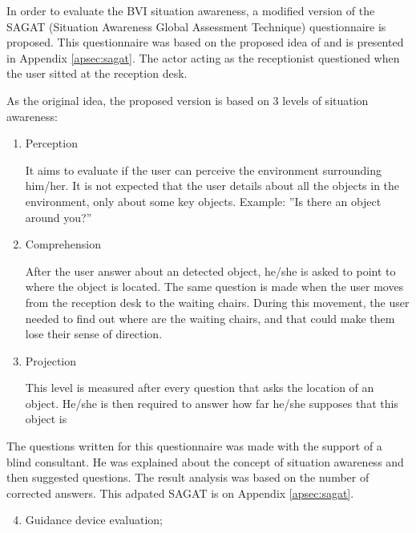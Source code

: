         In order to evaluate the BVI situation awareness, a modified version of the SAGAT (Situation Awareness Global Assessment Technique) questionnaire is proposed. This questionnaire was based on the proposed idea of  and is presented in Appendix \ref{apsec:sagat}. The actor acting as the receptionist questioned when the user sitted at the reception desk. 

        As the original idea, the proposed version is based on 3 levels of situation awareness:

        \begin{enumerate}[leftmargin = 6em, label = Level \arabic* -- ]
            \item Perception
            
            It aims to evaluate if the user can perceive the environment surrounding him/her. It is not expected that the user details about all the objects in the environment, only about some key objects. Example: ”Is there an object around you?”

            \item Comprehension
    
            After the user answer about an detected object, he/she is asked to point to where the object is located. The same question is made when the user moves from the reception desk to the waiting chairs. During this movement, the user needed to find out where are the waiting chairs, and that could make them lose their sense of direction.
    
            \item Projection
            
            This level is measured after every question that asks the location of an object. He/she is then required to answer how far he/she supposes that this object is
            
        \end{enumerate}      

        The questions written for this questionnaire was made with the support of a blind consultant. He was explained about the concept of situation awareness and then suggested questions. The result analysis was based on the number of corrected answers. This adpated SAGAT is on Appendix \ref{apsec:sagat}.

        \begin{enumerate} [label = \Alph*)]
            \setcounter{enumi}{3}
            \item Guidance device evaluation;
        \end{enumerate}

